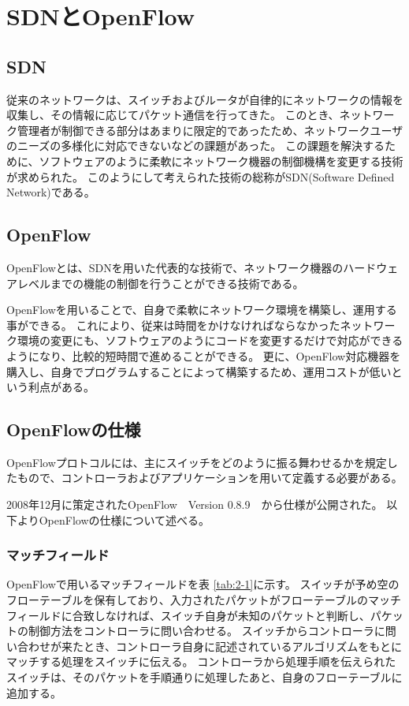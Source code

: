 \section{SDNとOpenFlow}

\subsection{SDN}

従来のネットワークは、スイッチおよびルータが自律的にネットワークの情報を収集し、その情報に応じてパケット通信を行ってきた\cite{openflownet}。
このとき、ネットワーク管理者が制御できる部分はあまりに限定的であったため、ネットワークユーザのニーズの多様化に対応できないなどの課題があった。
この課題を解決するために、ソフトウェアのように柔軟にネットワーク機器の制御機構を変更する技術が求められた。
このようにして考えられた技術の総称がSDN(Software Defined Network)である。

\subsection{OpenFlow}

OpenFlowとは、SDNを用いた代表的な技術で、ネットワーク機器のハードウェアレベルまでの機能の制御を行うことができる技術である\cite{openflowjapanese}。

OpenFlowを用いることで、自身で柔軟にネットワーク環境を構築し、運用する事ができる。
これにより、従来は時間をかけなければならなかったネットワーク環境の変更にも、ソフトウェアのようにコードを変更するだけで対応ができるようになり、比較的短時間で進めることができる。
更に、OpenFlow対応機器を購入し、自身でプログラムすることによって構築するため、運用コストが低いという利点がある。

\subsection{OpenFlowの仕様}

OpenFlowプロトコルには、主にスイッチをどのように振る舞わせるかを規定したもので、コントローラおよびアプリケーションを用いて定義する必要がある。


2008年12月に策定されたOpenFlow　Version 0.8.9\cite{openflow}　から仕様が公開された。
以下よりOpenFlowの仕様について述べる。

\subsubsection{マッチフィールド}

OpenFlowで用いるマッチフィールドを表 \ref{tab:2-1}に示す\cite{openflow}。
スイッチが予め空のフローテーブルを保有しており、入力されたパケットがフローテーブルのマッチフィールドに合致しなければ、スイッチ自身が未知のパケットと判断し、パケットの制御方法をコントローラに問い合わせる。
スイッチからコントローラに問い合わせが来たとき、コントローラ自身に記述されているアルゴリズムをもとにマッチする処理をスイッチに伝える。
コントローラから処理手順を伝えられたスイッチは、そのパケットを手順通りに処理したあと、自身のフローテーブルに追加する。

